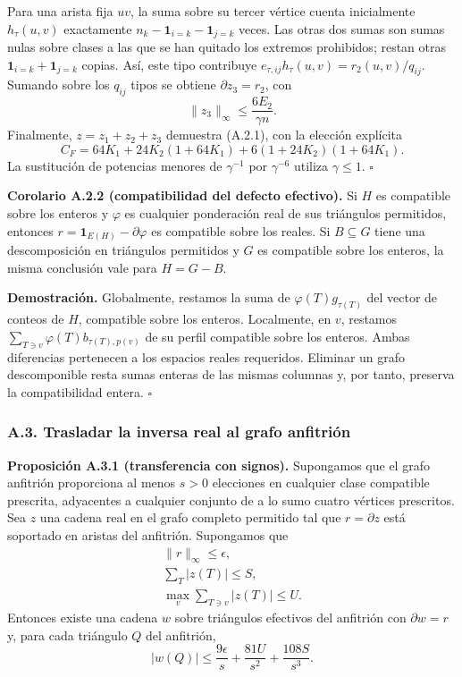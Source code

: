 \documentclass[spanish,11pt,a4paper]{article}
\begin{document}
Para una arista fija \(uv\), la suma sobre su tercer vértice cuenta inicialmente \(h_\tau(u,v)\) exactamente \(n_k-\mathbf1_{i=k}-\mathbf1_{j=k}\) veces. Las otras dos sumas son sumas nulas sobre clases a las que se han quitado los extremos prohibidos; restan otras \(\mathbf1_{i=k}+\mathbf1_{j=k}\) copias. Así, este tipo contribuye \(e_{\tau,ij}h_\tau(u,v)=r_2(u,v)/q_{ij}\). Sumando sobre los \(q_{ij}\) tipos se obtiene \(\partial z_3=r_2\), con \[\|z_3\|_\infty\le\frac{6E_2}{\gamma n}.\] Finalmente, \(z=z_1+z_2+z_3\) demuestra (A.2.1), con la elección explícita \[C_F=64K_1+24K_2(1+64K_1)
+6(1+24K_2)(1+64K_1).
\tag{A.2.6}\] La sustitución de potencias menores de \(\gamma^{-1}\) por \(\gamma^{-6}\) utiliza \(\gamma\le1\). \(\square\)

\textbf{Corolario A.2.2 (compatibilidad del defecto efectivo).} Si \(H\) es compatible sobre los enteros y \(\varphi\) es cualquier ponderación real de sus triángulos permitidos, entonces \(r=\mathbf1_{E(H)}-\partial\varphi\) es compatible sobre los reales. Si \(B\subseteq G\) tiene una descomposición en triángulos permitidos y \(G\) es compatible sobre los enteros, la misma conclusión vale para \(H=G-B\).

\textbf{Demostración.} Globalmente, restamos la suma de \(\varphi(T)g_{\tau(T)}\) del vector de conteos de \(H\), compatible sobre los enteros. Localmente, en \(v\), restamos \(\sum_{T\ni v}\varphi(T)b_{\tau(T),p(v)}\) de su perfil compatible sobre los enteros. Ambas diferencias pertenecen a los espacios reales requeridos. Eliminar un grafo descomponible resta sumas enteras de las mismas columnas y, por tanto, preserva la compatibilidad entera. \(\square\)

\subsubsection{A.3. Trasladar la inversa real al grafo anfitrión}\label{a.3.-trasladar-la-inversa-real-al-grafo-anfitriuxf3n}

\textbf{Proposición A.3.1 (transferencia con signos).} Supongamos que el grafo anfitrión proporciona al menos \(s>0\) elecciones en cualquier clase compatible prescrita, adyacentes a cualquier conjunto de a lo sumo cuatro vértices prescritos. Sea \(z\) una cadena real en el grafo completo permitido tal que \(r=\partial z\) está soportado en aristas del anfitrión. Supongamos que \[\begin{gathered}
\|r\|_\infty\le\epsilon,\\
\sum_T|z(T)|\le S,\\
\max_v\sum_{T\ni v}|z(T)|\le U.
\end{gathered}\] Entonces existe una cadena \(w\) sobre triángulos efectivos del anfitrión con \(\partial w=r\) y, para cada triángulo \(Q\) del anfitrión, \[|w(Q)|\le\frac{9\epsilon}{s}+
\frac{81U}{s^2}+\frac{108S}{s^3}.
\tag{A.3.1}\]
\end{document}
